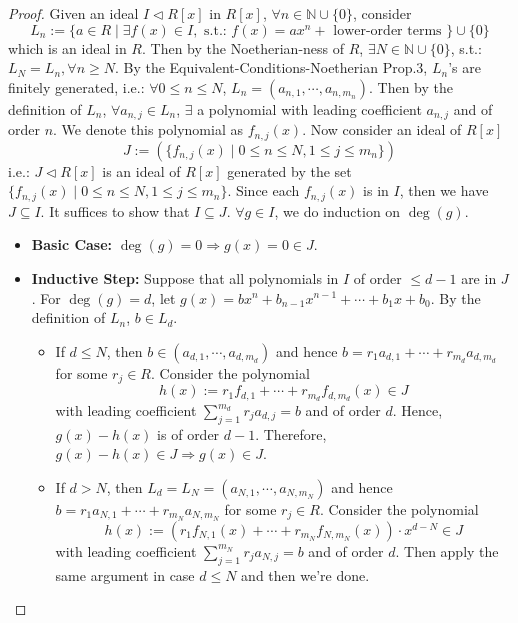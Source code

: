 \begin{proof}
    Given an ideal $I \triangleleft R[x]$ in $R[x]$, $\forall n \in \mathbb{N} \cup \{0\}$, consider
    $$L_n := \{a \in R \mid \exists f(x) \in I, \text{ s.t.: } f(x)=ax^n + \text{ lower-order terms } \} \cup \{0\} $$
    which is an ideal in $R$. Then by the Noetherian-ness of $R$, $\exists N \in \mathbb{N} \cup \{0\}$, s.t.: $L_N =L_{n} ,\forall n \geq N$. By the Equivalent-Conditions-Noetherian Prop.3, $L_n$'s are finitely generated, i.e.: $\forall 0 \leq n \leq N$, $L_{n} =(a_{n,1} ,\cdots, a_{n,m_n})$. Then by the definition of $L_n$, $\forall a_{n,j} \in L_n$, $\exists$ a polynomial with leading coefficient $a_{n,j}$ and of order $n$. We denote this polynomial as $f_{n,j} (x)$. Now consider an ideal of $R[x]$
    \[
    J := (\{ f_{n,j} (x) \mid 0 \leq n \leq N, 1\leq j \leq m_n \})
    \]
    i.e.: $J \triangleleft R[x]$ is an ideal of $R[x]$ generated by the set $\{ f_{n,j} (x) \mid 0 \leq n \leq N, 1\leq j \leq m_n \}$. Since each $f_{n,j} (x)$ is in $I$, then we have $J \subseteq I$. It suffices to show that $I \subseteq J$. $\forall g\in I$, we do induction on $\deg (g)$.

    \begin{itemize}
        \item \textbf{Basic Case:} $\deg (g) =0 \Rightarrow g(x) =0 \in J$.
        \item \textbf{Inductive Step:} Suppose that all polynomials in $I$ of order $\leq d-1$ are in $J$. For $\deg (g) =d$, let $g(x) =bx^n +b_{n-1}x^{n-1} +\cdots+ b_1x +b_0$. By the definition of $L_n$, $b \in L_d$.

        \begin{itemize}
            \item If $d\leq N$, then $b \in (a_{d,1} ,\cdots, a_{d, m_d})$ and hence $b= r_1 a_{d,1} +\cdots +r_{m_d} a_{d,m_d}$ for some $r_j \in R$. Consider the polynomial
            $$h(x) := r_1 f_{d,1} +\cdots+ r_{m_d} f_{d,m_d} (x) \in J$$
            with leading coefficient $\sum_{j=1}^{m_d} r_j a_{d,j} =b$ and of order $d$. Hence, $g(x) -h(x)$ is of order $d-1$. Therefore, $g(x) -h(x) \in J \Rightarrow g(x) \in J$.

            \item If $d >N$, then $L_d =L_N =(a_{N,1} ,\cdots, a_{N,m_N})$ and hence $b= r_1 a_{N,1} + \cdots+ r_{m_N} a_{N,m_N}$ for some $r_j \in R$. Consider the polynomial
            \[
            h(x) := (r_1 f_{N,1} (x) +\cdots+ r_{m_N} f_{N,m_N} (x)) \cdot x^{d-N} \in J
            \]
            with leading coefficient $\sum_{j=1}^{m_N} r_ja_{N,j} =b$ and of order $d$. Then apply the same argument in case $d\leq N$ and then we're done.
        \end{itemize}
    \end{itemize}
\end{proof}

